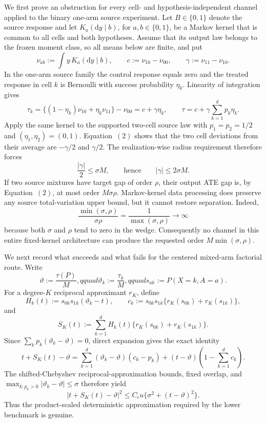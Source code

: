 \documentclass{article}
\begin{document}
We first prove an obstruction for every cell- and hypothesis-independent channel applied to the binary one-arm source experiment.  Let \(B\in\{0,1\}\) denote the source response and let \(K_a(\mathrm dy\mid b)\), for \(a,b\in\{0,1\}\), be a Markov kernel that is common to all cells and both hypotheses.  Assume that its output law belongs to the frozen moment class, so all means below are finite, and put
\[
 \nu_{ab}:=\int y\,K_a(\mathrm dy\mid b),
 \qquad c:=\nu_{10}-\nu_{00},
 \qquad \gamma:=\nu_{11}-\nu_{10}.
\]
In the one-arm source family the control response equals zero and the treated response in cell \(k\) is Bernoulli with success probability \(\eta_k\).  Linearity of integration gives
\[
 \tau_k
 =\{(1-\eta_k)\nu_{10}+\eta_k\nu_{11}\}-\nu_{00}
 =c+\gamma\eta_k,
 \qquad
 \tau=c+\gamma\sum_{k=1}^dp_k\eta_k.
\tag{2}
\]
Apply the same kernel to the supported two-cell source law with \(p_1=p_2=1/2\) and \((\eta_1,\eta_2)=(0,1)\).  Equation~\((2)\) shows that the two cell deviations from their average are \(-\gamma/2\) and \(\gamma/2\).  The realization-wise radius requirement therefore forces
\[
 \frac{|\gamma|}{2}\le\sigma M,
 \qquad\text{hence}\qquad
 |\gamma|\le2\sigma M.
\tag{3}
\]
If two source mixtures have target gap of order \(\rho\), their output ATE gap is, by Equation~\((2)\), at most order \(M\sigma\rho\).  Markov-kernel data processing does preserve any source total-variation upper bound, but it cannot restore separation.  Indeed,
\[
 \frac{\min(\sigma,\rho)}{\sigma\rho}
 =\frac1{\max(\sigma,\rho)}\longrightarrow\infty
\tag{4}
\]
because both \(\sigma\) and \(\rho\) tend to zero in the wedge.  Consequently no channel in this entire fixed-kernel architecture can produce the requested order \(M\min(\sigma,\rho)\).

We next record what succeeds and what fails for the centered mixed-arm factorial route.  Write
\[
 \vartheta:=\frac{\tau(P)}M,qquad
 \vartheta_k:=\frac{\tau_k}M,qquad
 s_{ak}:=P(X=k,A=a).
\]
For a degree-\(K\) reciprocal approximant \(r_K\), define
\[
 H_k(t):=s_{0k}s_{1k}(\vartheta_k-t),
 \qquad
 c_k:=s_{0k}s_{1k}\{r_K(s_{0k})+r_K(s_{1k})\},
\]
and
\[
 S_K(t):=\sum_{k=1}^d
 H_k(t)\{r_K(s_{0k})+r_K(s_{1k})\}.
\]
Since \(\sum_kp_k(\vartheta_k-\vartheta)=0\), direct expansion gives the exact identity
\[
 t+S_K(t)-\vartheta
 =\sum_{k=1}^d(\vartheta_k-\vartheta)(c_k-p_k)
 +(t-\vartheta)\left(1-\sum_{k=1}^dc_k\right).
\tag{5}
\]
The shifted-Chebyshev reciprocal-approximation bounds, fixed overlap, and
\(\max_{k:p_k>0}|\vartheta_k-\vartheta|\le\sigma\) therefore yield
\[
 |t+S_K(t)-\vartheta|^2
 \le C_{\epsilon}u\{\sigma^2+(t-\vartheta)^2\}.
\tag{6}
\]
Thus the product-scaled deterministic approximation required by the lower benchmark is genuine.
\end{document}
